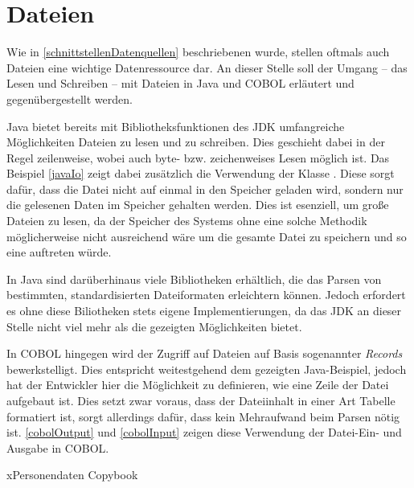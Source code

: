 \section{Dateien}
Wie in \autoref{schnittstellenDatenquellen} beschriebenen wurde, stellen oftmals auch Dateien eine wichtige Datenressource dar. An dieser Stelle soll der Umgang -- das Lesen und Schreiben -- mit Dateien in Java und COBOL erläutert und gegenübergestellt werden.

Java bietet bereits mit Bibliotheksfunktionen des JDK umfangreiche Möglichkeiten Dateien zu lesen und zu schreiben. Dies geschieht dabei in der Regel zeilenweise, wobei auch byte- bzw. zeichenweises Lesen möglich ist. Das Beispiel \autoref{javaIo} zeigt dabei zusätzlich die Verwendung der Klasse . Diese sorgt dafür, dass die Datei nicht auf einmal in den Speicher geladen wird, sondern nur die gelesenen Daten im Speicher gehalten werden. Dies ist esenziell, um große Dateien zu lesen, da der Speicher des Systems ohne eine solche Methodik möglicherweise nicht ausreichend wäre um die gesamte Datei zu speichern und so eine  auftreten würde.


In Java sind darüberhinaus viele Bibliotheken erhältlich, die das Parsen von bestimmten, standardisierten Dateiformaten erleichtern können. Jedoch erfordert es ohne diese Biliotheken stets eigene Implementierungen, da das JDK an dieser Stelle nicht viel mehr als die gezeigten Möglichkeiten bietet.

In COBOL hingegen wird der Zugriff auf Dateien auf Basis sogenannter \textit{Records} bewerkstelligt. Dies entspricht weitestgehend dem gezeigten Java-Beispiel, jedoch hat der Entwickler hier die Möglichkeit zu definieren, wie eine Zeile der Datei aufgebaut ist. Dies setzt zwar voraus, dass der Dateiinhalt in einer Art Tabelle formatiert ist, sorgt allerdings dafür, dass kein Mehraufwand beim Parsen nötig ist. \autoref{cobolOutput} und \autoref{cobolInput} zeigen diese Verwendung der Datei-Ein- und Ausgabe in COBOL.


x{Personendaten Copybook}{}


